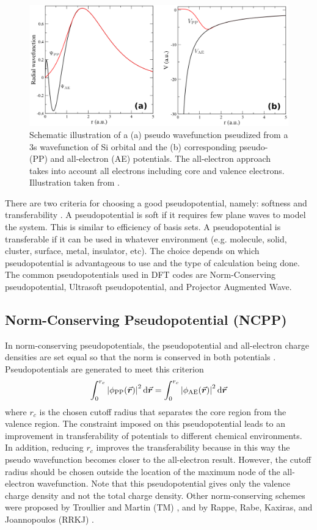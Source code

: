 \begin{figure}[tbh!]
	\centering
	\includegraphics[width=0.8\linewidth]{"images/computational/PP_combine"}
	\caption[ Schematic illustration of a pseudo wavefunction pseudized from a 3s wavefunction of Si orbital]{Schematic illustration of a  (a) pseudo wavefunction pseudized from a 3s wavefunction of Si orbital and the (b) corresponding pseudo- (PP) and all-electron (AE) potentials. The all-electron approach takes into account all electrons including core and valence electrons. Illustration taken from \citep{Jochym2008}.}
	\label{fig:PP}
\end{figure}

There are two criteria for choosing a good pseudopotential, namely: softness and transferability \citep{Troullier1990,Fuchs1999}. A pseudopotential is soft  if it requires few plane waves to model the system. This is similar to efficiency of basis sets. A pseudopotential is transferable  if it can be used in whatever environment (e.g. molecule, solid, cluster, surface, metal, insulator, etc). The choice depends on which pseudopotential is advantageous to use  and the type of calculation being done. The common pseudopotentials used in DFT codes are Norm-Conserving pseudopotential, Ultrasoft pseudopotential, and Projector Augmented Wave.

\subsection{Norm-Conserving Pseudopotential (NCPP)}
In norm-conserving pseudopotentials, the pseudopotential and all-electron charge densities are set  equal so that the norm is conserved in both potentials \citep{Hamann1979,Troullier1991}. Pseudopotentials are generated to meet this criterion
\begin{equation}
	\int_0^{r_c} \abs{\phi_{\text{PP}}(\va*{r})}^2 \dd{\va*{r}} = \int_0^{r_c} \abs{\phi_{\text{AE}}(\va*{r})}^2 \dd{\va*{r}}
\end{equation}
where $r_c$ is the chosen cutoff radius that separates the core region from the valence region. The constraint imposed on this pseudopotential leads to an improvement in transferability of potentials to different chemical environments. In addition, reducing $r_c$ improves the transferability  because in this way the pseudo wavefunction becomes closer to the all-electron result. However, the cutoff radius should be chosen outside the location of the maximum node of the all-electron wavefunction. Note that this pseudopotential gives only the valence charge density and not the total charge density. Other norm-conserving schemes were proposed by Troullier and Martin (TM) \citep{Troullier1991}, and by Rappe, Rabe, Kaxiras, and Joannopoulos (RRKJ) \citep{Rappe1990}.

